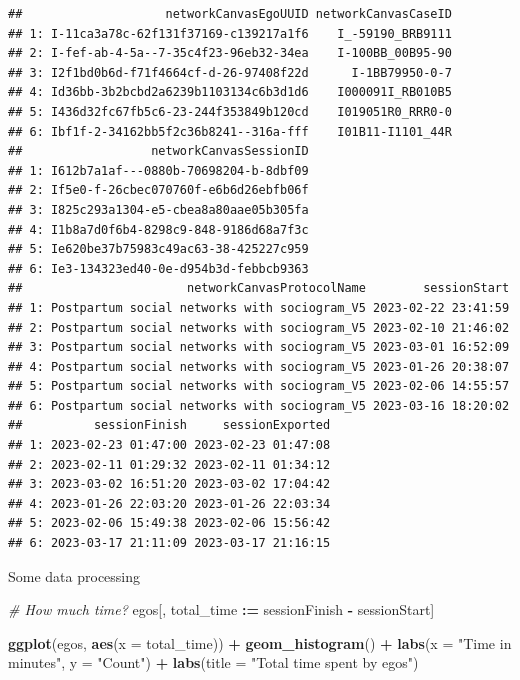 \documentclass[
]{book}
\newenvironment{Shaded}{\begin{snugshade}}{\end{snugshade}}
\newcommand{\AttributeTok}[1]{\textcolor[rgb]{0.13,0.29,0.53}{#1}}
\newcommand{\CommentTok}[1]{\textcolor[rgb]{0.56,0.35,0.01}{\textit{#1}}}
\newcommand{\FunctionTok}[1]{\textcolor[rgb]{0.13,0.29,0.53}{\textbf{#1}}}
\newcommand{\NormalTok}[1]{#1}
\newcommand{\SpecialCharTok}[1]{\textcolor[rgb]{0.81,0.36,0.00}{\textbf{#1}}}
\newcommand{\StringTok}[1]{\textcolor[rgb]{0.31,0.60,0.02}{#1}}
\begin{document}
\begin{verbatim}
##                    networkCanvasEgoUUID networkCanvasCaseID
## 1: I-11ca3a78c-62f131f37169-c139217a1f6    I_-59190_BRB9111
## 2: I-fef-ab-4-5a--7-35c4f23-96eb32-34ea    I-100BB_00B95-90
## 3: I2f1bd0b6d-f71f4664cf-d-26-97408f22d      I-1BB79950-0-7
## 4: Id36bb-3b2bcbd2a6239b1103134c6b3d1d6    I000091I_RB010B5
## 5: I436d32fc67fb5c6-23-244f353849b120cd    I019051R0_RRR0-0
## 6: Ibf1f-2-34162bb5f2c36b8241--316a-fff    I01B11-I1101_44R
##                  networkCanvasSessionID
## 1: I612b7a1af---0880b-70698204-b-8dbf09
## 2: If5e0-f-26cbec070760f-e6b6d26ebfb06f
## 3: I825c293a1304-e5-cbea8a80aae05b305fa
## 4: I1b8a7d0f6b4-8298c9-848-9186d68a7f3c
## 5: Ie620be37b75983c49ac63-38-425227c959
## 6: Ie3-134323ed40-0e-d954b3d-febbcb9363
##                       networkCanvasProtocolName        sessionStart
## 1: Postpartum social networks with sociogram_V5 2023-02-22 23:41:59
## 2: Postpartum social networks with sociogram_V5 2023-02-10 21:46:02
## 3: Postpartum social networks with sociogram_V5 2023-03-01 16:52:09
## 4: Postpartum social networks with sociogram_V5 2023-01-26 20:38:07
## 5: Postpartum social networks with sociogram_V5 2023-02-06 14:55:57
## 6: Postpartum social networks with sociogram_V5 2023-03-16 18:20:02
##          sessionFinish     sessionExported
## 1: 2023-02-23 01:47:00 2023-02-23 01:47:08
## 2: 2023-02-11 01:29:32 2023-02-11 01:34:12
## 3: 2023-03-02 16:51:20 2023-03-02 17:04:42
## 4: 2023-01-26 22:03:20 2023-01-26 22:03:34
## 5: 2023-02-06 15:49:38 2023-02-06 15:56:42
## 6: 2023-03-17 21:11:09 2023-03-17 21:16:15
\end{verbatim}

Some data processing

\begin{Shaded}
\begin{Highlighting}[]
\CommentTok{\# How much time?}
\NormalTok{egos[, total\_time }\SpecialCharTok{:=}\NormalTok{ sessionFinish }\SpecialCharTok{{-}}\NormalTok{ sessionStart]}

\FunctionTok{ggplot}\NormalTok{(egos, }\FunctionTok{aes}\NormalTok{(}\AttributeTok{x =}\NormalTok{ total\_time)) }\SpecialCharTok{+}
  \FunctionTok{geom\_histogram}\NormalTok{() }\SpecialCharTok{+}
  \FunctionTok{labs}\NormalTok{(}\AttributeTok{x =} \StringTok{"Time in minutes"}\NormalTok{, }\AttributeTok{y =} \StringTok{"Count"}\NormalTok{) }\SpecialCharTok{+}
  \FunctionTok{labs}\NormalTok{(}\AttributeTok{title =} \StringTok{"Total time spent by egos"}\NormalTok{)}
\end{Highlighting}
\end{Shaded}
\end{document}
